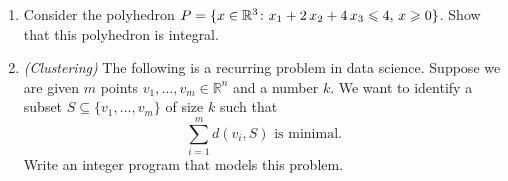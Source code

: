 \begin{enumerate}
    
 

  
 \item Consider the polyhedron $P = \{ x \in \mathbb{R}^3 \colon x_1 + 2\,x_2 + 4\,
  x_3 \leqslant 4, \, x\geqslant0\}$. Show that this polyhedron is
  integral. 

\item \emph{(Clustering)} The following is a recurring problem in data science. Suppose we are given $m$ points $v_1,\dots,v_m ∈ ℝ^n$ and a number $k$. We want to identify a subset $S ⊆ \{v_1,\dots,v_m\}$ of size $k$ such that
  \begin{displaymath}
    ∑_{i=1}^m d(v_i, S)  \text{ is minimal.} 
  \end{displaymath}
  Write an integer program that models this problem.

    

  
\end{enumerate}




% 

% 



